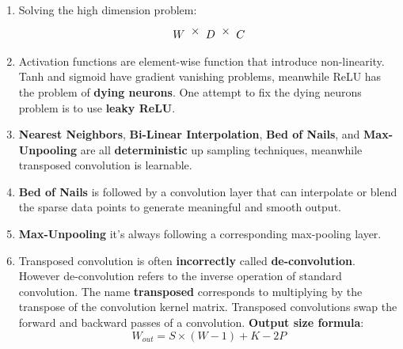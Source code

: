 \documentclass[12pt]{article}
\begin{document}
\begin{enumerate}
    \item Solving the high dimension problem:
    \begin{equation*}
    \tikz[baseline]{\node(d1) {$W$}} \times \tikz[baseline]{\node(d2){$D$}} \times \tikz[baseline]{\node(d3) {$C$}}
    \end{equation*}
    \vspace{1cm}\par
    \noindent\hfil{}

    \item Activation functions are element-wise function that introduce non-linearity. Tanh and sigmoid have gradient vanishing problems, meanwhile ReLU has the problem of \textbf{dying neurons}. One attempt to fix the dying neurons problem is to use \textbf{leaky ReLU}.

    \item  \textbf{Nearest Neighbors}, \textbf{Bi-Linear Interpolation}, \textbf{Bed of Nails}, and \textbf{Max-Unpooling} are all \textbf{deterministic} up sampling techniques, meanwhile transposed convolution is learnable.

    \item \textbf{Bed of Nails} is followed by a convolution layer that can interpolate or blend the sparse data points to generate meaningful and smooth output.

    \item \textbf{Max-Unpooling} it's always following a corresponding max-pooling layer. 

    \item Transposed convolution is often \textbf{incorrectly} called \textbf{de-convolution}. However de-convolution refers to the inverse operation of standard convolution. The name \textbf{transposed} corresponds to multiplying by the transpose of the convolution kernel matrix. Transposed convolutions swap the forward and backward passes of a convolution.
    \textbf{Output size formula}:
    \[
    W_{out} = S \times (W - 1) + K - 2P
    \]


\end{enumerate}
\end{document}
